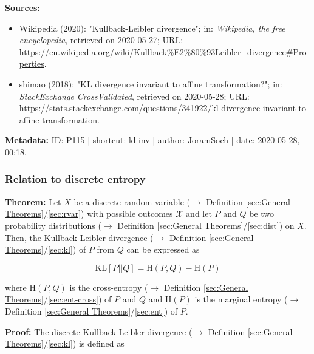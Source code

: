 \documentclass[a4paper,12pt,twoside]{book}
\begin{document}
\vspace{1em}
\textbf{Sources:}
\begin{itemize}
\item Wikipedia (2020): "Kullback-Leibler divergence"; in: \textit{Wikipedia, the free encyclopedia}, retrieved on 2020-05-27; URL: \url{https://en.wikipedia.org/wiki/Kullback%E2%80%93Leibler_divergence#Properties}.
\item shimao (2018): "KL divergence invariant to affine transformation?"; in: \textit{StackExchange CrossValidated}, retrieved on 2020-05-28; URL: \url{https://stats.stackexchange.com/questions/341922/kl-divergence-invariant-to-affine-transformation}.
\end{itemize}


\vspace{1em}
\textbf{Metadata:} ID: P115 | shortcut: kl-inv | author: JoramSoch | date: 2020-05-28, 00:18.
\vspace{1em}



\subsubsection[\textbf{Relation to discrete entropy}]{Relation to discrete entropy} \label{sec:kl-ent}
\setcounter{equation}{0}

\textbf{Theorem:} Let $X$ be a discrete random variable ($\rightarrow$ Definition \ref{sec:General Theorems}/\ref{sec:rvar}) with possible outcomes $\mathcal{X}$ and let $P$ and $Q$ be two probability distributions ($\rightarrow$ Definition \ref{sec:General Theorems}/\ref{sec:dist}) on $X$. Then, the Kullback-Leibler divergence ($\rightarrow$ Definition \ref{sec:General Theorems}/\ref{sec:kl}) of $P$ from $Q$ can be expressed as

\begin{equation} \label{eq:kl-ent-kl-ent}
\mathrm{KL}[P||Q] = \mathrm{H}(P,Q) - \mathrm{H}(P)
\end{equation}

where $\mathrm{H}(P,Q)$ is the cross-entropy ($\rightarrow$ Definition \ref{sec:General Theorems}/\ref{sec:ent-cross}) of $P$ and $Q$ and $\mathrm{H}(P)$ is the marginal entropy ($\rightarrow$ Definition \ref{sec:General Theorems}/\ref{sec:ent}) of $P$.


\vspace{1em}
\textbf{Proof:} The discrete Kullback-Leibler divergence ($\rightarrow$ Definition \ref{sec:General Theorems}/\ref{sec:kl}) is defined as
\end{document}
